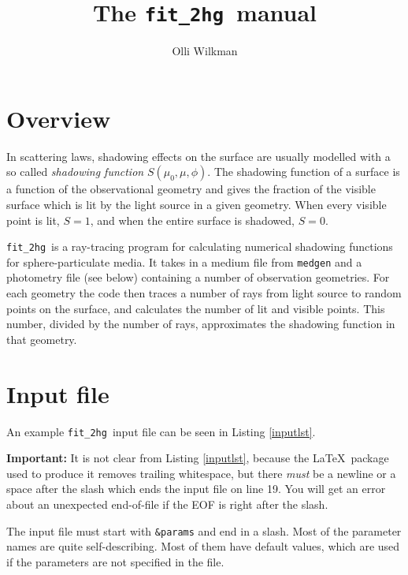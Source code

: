 \documentclass[a4paper]{article}
\newcommand{\code}[1]{\lstinline{#1}}
\newcommand{\this}[0]{\texttt{fit\_2hg}}
\newcommand{\prog}[1]{\texttt{#1}}
\begin{document}
	
\title{The \this~manual}
\author{Olli Wilkman}

\maketitle

\tableofcontents

\section{Overview}

In scattering laws, shadowing effects on the surface are usually modelled with a so called \emph{shadowing function} $S(\mu_0, \mu, \phi)$. The shadowing function of a surface is a function of the observational geometry and gives the fraction of the visible surface which is lit by the light source in a given geometry. When every visible point is lit, $S = 1$, and when the entire surface is shadowed, $S=0$.

\this~is a ray-tracing program for calculating numerical shadowing functions for sphere-particulate media. It takes in a medium file from \prog{medgen} and a photometry file (see below) containing a number of observation geometries. For each geometry the code then traces a number of rays from light source to random points on the surface, and calculates the number of lit and visible points. This number, divided by the number of rays, approximates the shadowing function in that geometry.

\section{Input file}\label{input}

An example \this~input file can be seen in Listing \ref{inputlst}.

\textbf{Important:} It is not clear from Listing \ref{inputlst}, because the \LaTeX~package used to produce it removes trailing whitespace, but there \emph{must} be a newline or a space after the slash which ends the input file on line 19. You will get an error about an unexpected end-of-file if the EOF is right after the slash.

The input file must start with \code{&params} and end in a slash. Most of the parameter names are quite self-describing. Most of them have default values, which are used if the parameters are not specified in the file.
\end{document}

